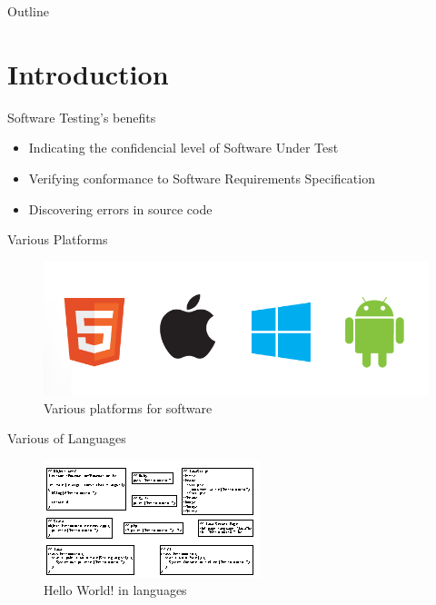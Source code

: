 \documentclass{beamer}
\title{\ThesisNameEN}
\subtitle{IMECS2017}
\date[2017.03.14]{\today}
\author{\authorNameEN~\small{and~\advisorEn}}
\institute{{\facultyEn}, {\universityEn}}
\begin{document}
\maketitle

\begin{frame}[t]{Outline}
    \tableofcontents[hideallsubsections]
\end{frame}

\newcommand{\displayframe}{%
    \begin{frame}{Outline}
    \tableofcontents[%
        currentsection,
        subsectionstyle=hide
        ]
    \end{frame}
}
%
\section{Introduction}
\begin{frame}{Software Testing's benefits}
  \begin{itemize}
     \item Indicating the confidencial level of Software Under Test
     \item Verifying conformance to Software Requirements Specification
     \item Discovering errors in source code
  \end{itemize}
\end{frame}

\begin{frame}{Various Platforms}
    \begin{figure}
        \includegraphics[width=.8\paperwidth]{figure/mobile_bugs}
        \caption{Various platforms for software}
        \label{fig:variousplatform}
    \end{figure}
\end{frame}

\begin{frame}{Various of Languages}
    \begin{figure}
        \includegraphics[width=.9\paperwidth]{figure/hello-world-lang}
        \caption{Hello World! in languages}
        \label{fig:helloworld}
    \end{figure}
\end{frame}
\end{document}
